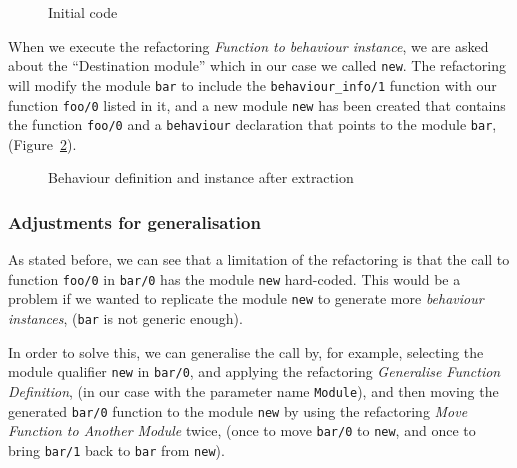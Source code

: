 \begin{figure}

\caption{Initial code\label{fig:initial_code}}
\end{figure}


When we execute the refactoring \emph{Function to behaviour instance},
we are asked about the ``Destination module'' which in our case
we called \texttt{new}. The refactoring will modify the module \texttt{bar}
to include the \texttt{behaviour\_info/1} function with our function
\texttt{foo/0} listed in it, and a new module \texttt{new} has been
created that contains the function \texttt{foo/0} and a \texttt{behaviour}
declaration that points to the module \texttt{bar}, 
(Figure~\ref{fig:after_ref}).

\begin{figure}
\begin{minipage}[t]{0.65\textwidth}%
%
\end{minipage}%
\begin{minipage}[t]{0.35\textwidth}%
%
\end{minipage}

\caption{Behaviour definition and instance after 
extraction\label{fig:after_ref}}
\end{figure}



\subsubsection{Adjustments for 
generalisation\label{sub:adjustments-for-generalisation}}

As stated before, we can see that a limitation of the refactoring
is that the call to function \texttt{foo/0} in \texttt{bar/0} has
the module \texttt{new} hard-coded. This would be a problem if we
wanted to replicate the module \texttt{new} to generate more \emph{behaviour
instances}, (\texttt{bar} is not generic enough).

In order to solve this, we can generalise the call by, for example,
selecting the module qualifier \texttt{new} in \texttt{bar/0}, and
applying the refactoring \emph{Generalise Function Definition}, (in
our case with the parameter name \texttt{Module}), and then moving
the generated \texttt{bar/0} function to the module \texttt{new} by
using the refactoring \emph{Move Function to Another Module} twice,
(once to move \texttt{bar/0} to \texttt{new}, and once to bring \texttt{bar/1}
back to \texttt{bar} from \texttt{new}).

